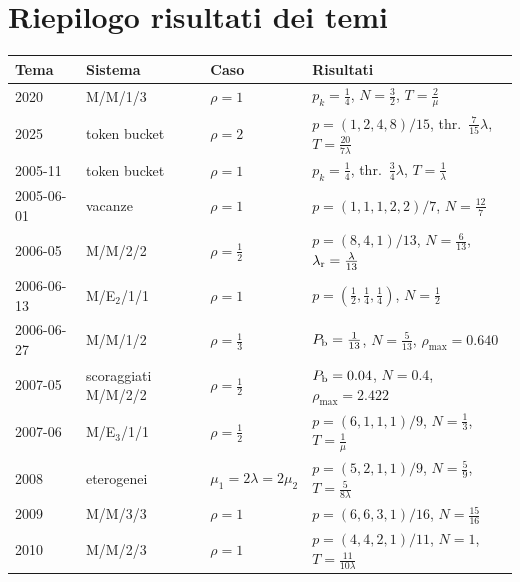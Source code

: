 \section{Riepilogo risultati dei temi}
\begin{center}\small
\begin{tabular}{llll}
\toprule
Tema & Sistema & Caso & Risultati\\
\midrule
2020 & M/M/1/3 & $\rho=1$ & $p_k=\tfrac14$, $N=\tfrac32$, $T=\tfrac2\mu$\\
2025 & token bucket & $\rho=2$ & $p=(1,2,4,8)/15$, thr.\ $\tfrac7{15}\lambda$, $T=\tfrac{20}{7\lambda}$\\
2005-11 & token bucket & $\rho=1$ & $p_k=\tfrac14$, thr.\ $\tfrac34\lambda$, $T=\tfrac1\lambda$\\
2005-06-01 & vacanze & $\rho=1$ & $p=(1,1,1,2,2)/7$, $N=\tfrac{12}7$\\
2006-05 & M/M/2/2 & $\rho=\tfrac12$ & $p=(8,4,1)/13$, $N=\tfrac6{13}$, $\lambda_{\mathrm{r}}=\tfrac\lambda{13}$\\
2006-06-13 & M/E$_2$/1/1 & $\rho=1$ & $p=(\tfrac12,\tfrac14,\tfrac14)$, $N=\tfrac12$\\
2006-06-27 & M/M/1/2 & $\rho=\tfrac13$ & $P_{\mathrm{b}}=\tfrac1{13}$, $N=\tfrac5{13}$, $\rho_{\max}=0.640$\\
2007-05 & scoraggiati M/M/2/2 & $\rho=\tfrac12$ & $P_{\mathrm{b}}=0.04$, $N=0.4$, $\rho_{\max}=2.422$\\
2007-06 & M/E$_3$/1/1 & $\rho=\tfrac12$ & $p=(6,1,1,1)/9$, $N=\tfrac13$, $T=\tfrac1\mu$\\
2008 & eterogenei & $\mu_1{=}2\lambda{=}2\mu_2$ & $p=(5,2,1,1)/9$, $N=\tfrac59$, $T=\tfrac5{8\lambda}$\\
2009 & M/M/3/3 & $\rho=1$ & $p=(6,6,3,1)/16$, $N=\tfrac{15}{16}$\\
2010 & M/M/2/3 & $\rho=1$ & $p=(4,4,2,1)/11$, $N=1$, $T=\tfrac{11}{10\lambda}$\\
\bottomrule
\end{tabular}
\end{center}

